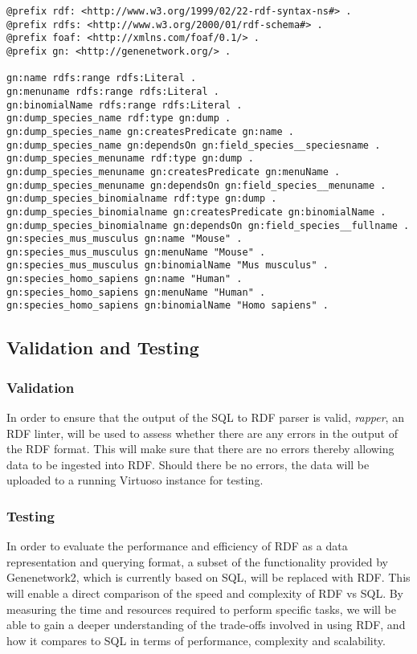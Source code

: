 \begin{verbatim}
@prefix rdf: <http://www.w3.org/1999/02/22-rdf-syntax-ns#> .
@prefix rdfs: <http://www.w3.org/2000/01/rdf-schema#> .
@prefix foaf: <http://xmlns.com/foaf/0.1/> .
@prefix gn: <http://genenetwork.org/> .

gn:name rdfs:range rdfs:Literal .
gn:menuname rdfs:range rdfs:Literal .
gn:binomialName rdfs:range rdfs:Literal .
gn:dump_species_name rdf:type gn:dump .
gn:dump_species_name gn:createsPredicate gn:name .
gn:dump_species_name gn:dependsOn gn:field_species__speciesname .
gn:dump_species_menuname rdf:type gn:dump .
gn:dump_species_menuname gn:createsPredicate gn:menuName .
gn:dump_species_menuname gn:dependsOn gn:field_species__menuname .
gn:dump_species_binomialname rdf:type gn:dump .
gn:dump_species_binomialname gn:createsPredicate gn:binomialName .
gn:dump_species_binomialname gn:dependsOn gn:field_species__fullname .
gn:species_mus_musculus gn:name "Mouse" .
gn:species_mus_musculus gn:menuName "Mouse" .
gn:species_mus_musculus gn:binomialName "Mus musculus" .
gn:species_homo_sapiens gn:name "Human" .
gn:species_homo_sapiens gn:menuName "Human" .
gn:species_homo_sapiens gn:binomialName "Homo sapiens" .
\end{verbatim}


\subsection{Validation and Testing}
\subsubsection*{Validation}
In order to ensure that the output of the SQL to RDF parser is valid, \textit{rapper}, an RDF linter, will be used to assess whether there are any errors in the output of the RDF format.  This will make sure that there are no errors thereby allowing data to be ingested into RDF.  Should there be no errors, the data will be uploaded to a running Virtuoso instance for testing.

\subsubsection*{Testing}

In order to evaluate the performance and efficiency of RDF as a data representation and querying format, a subset of the functionality provided by Genenetwork2, which is currently based on SQL, will be replaced with RDF.  This will enable a direct comparison of the speed and complexity of RDF vs SQL.  By measuring the time and resources required to perform specific tasks, we will be able to gain a deeper understanding of the trade-offs involved in using RDF, and how it compares to SQL in terms of performance, complexity and scalability.


